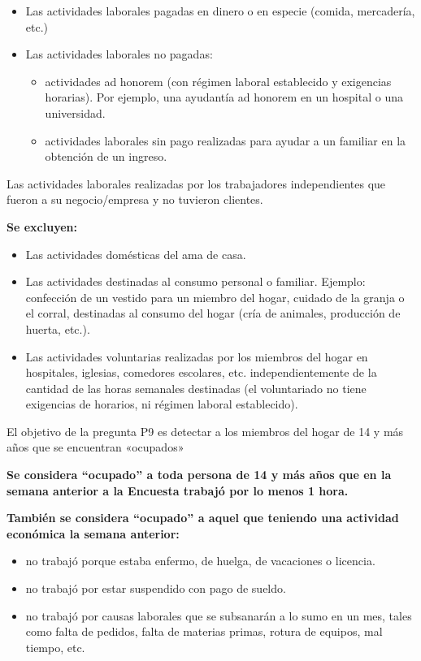\documentclass[
  openany]{book}
\begin{document}
\begin{itemize}
\item
  Las actividades laborales pagadas en dinero o en especie (comida, mercadería, etc.)
\item
  Las actividades laborales no pagadas:

  \begin{itemize}
  \item
    actividades ad honorem (con régimen laboral establecido y exigencias horarias). Por ejemplo, una ayudantía ad honorem en un hospital o una universidad.
  \item
    actividades laborales sin pago realizadas para ayudar a un familiar en la obtención de un ingreso.
  \end{itemize}
\end{itemize}

Las actividades laborales realizadas por los trabajadores independientes que fueron a su negocio/empresa y no tuvieron clientes.

\textbf{Se excluyen:}

\begin{itemize}
\item
  Las actividades domésticas del ama de casa.
\item
  Las actividades destinadas al consumo personal o familiar. Ejemplo: confección de un vestido para un miembro del hogar, cuidado de la granja o el corral, destinadas al consumo del hogar (cría de animales, producción de huerta, etc.).
\item
  Las actividades voluntarias realizadas por los miembros del hogar en hospitales, iglesias, comedores escolares, etc. independientemente de la cantidad de las horas semanales destinadas (el voluntariado no tiene exigencias de horarios, ni régimen laboral establecido).
\end{itemize}

El objetivo de la pregunta P9 es detectar a los miembros del hogar de 14 y más años que se encuentran «ocupados»

\textbf{Se considera ``ocupado'' a toda persona de 14 y más años que en la semana anterior a la Encuesta trabajó por lo menos 1 hora.}

\textbf{También se considera ``ocupado'' a aquel que teniendo una actividad económica la semana anterior:}

\begin{itemize}
\item
  no trabajó porque estaba enfermo, de huelga, de vacaciones o licencia.
\item
  no trabajó por estar suspendido con pago de sueldo.
\item
  no trabajó por causas laborales que se subsanarán a lo sumo en un mes, tales como falta de pedidos, falta de materias primas, rotura de equipos, mal tiempo, etc.
\end{itemize}
\end{document}
